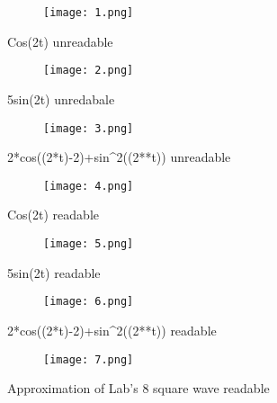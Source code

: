 \documentclass[12pt,a4paper]{article}
\begin{document}
\begin{figure}[h]
\centering
\begin{subfigure}{ 1\textwidth}
\texttt{[image: 1.png]}
\end{subfigure}
\caption{ Cos(2\pi t) unreadable  }
\label{fig2:image22}
\end{figure}

\begin{figure}[h]
\centering
\begin{subfigure}{ 1\textwidth}
\texttt{[image: 2.png]}
\end{subfigure}
\caption{ 5sin(2\pi t) unredabale }
\label{fig2:image22}
\end{figure}
\clearpage

\begin{figure}[h]
\centering
\begin{subfigure}{ 1\textwidth}
\texttt{[image: 3.png]}
\end{subfigure}
\caption{ 2*cos((2*\pi*t)-2)+sin^2((2**t)) unreadable  }
\label{fig2:image22}
\end{figure}

\begin{figure}[h]
\centering
\begin{subfigure}{ 1\textwidth}
\texttt{[image: 4.png]}
\end{subfigure}
\caption{ Cos(2\pi t)  readable }
\label{fig2:image22}
\end{figure}
\clearpage

\begin{figure}[h]
\centering
\begin{subfigure}{ 1\textwidth}
\texttt{[image: 5.png]}
\end{subfigure}
\caption{  5sin(2\pi t) readable }
\label{fig2:image22}
\end{figure}


\begin{figure}[h]
\centering
\begin{subfigure}{ 1\textwidth}
\texttt{[image: 6.png]}
\end{subfigure}
\caption{ 2*cos((2*\pi*t)-2)+sin^2((2**t)) readable }
\label{fig2:image22}
\end{figure}
\clearpage



\begin{figure}[h]
\centering
\begin{subfigure}{ 1\textwidth}
\texttt{[image: 7.png]}
\end{subfigure}
\caption{ Approximation of Lab's 8 square wave readable }
\label{fig2:image22}
\end{figure}
\clearpage
\end{document}
